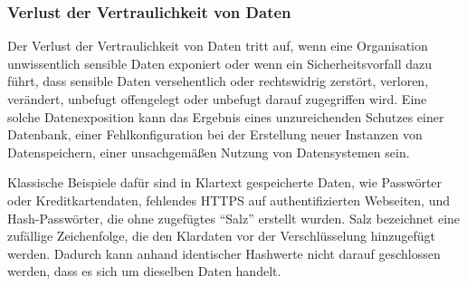 \subsubsection{Verlust der Vertraulichkeit von Daten}

Der Verlust der Vertraulichkeit von  Daten tritt auf, wenn eine
Organisation unwissentlich sensible Daten exponiert oder wenn ein
Sicherheitsvorfall dazu führt, dass sensible Daten versehentlich
oder rechtswidrig zerstört, verloren, verändert, unbefugt
offengelegt oder unbefugt darauf zugegriffen wird. Eine solche
Datenexposition kann das Ergebnis eines unzureichenden Schutzes einer
Datenbank, einer Fehlkonfiguration bei der Erstellung neuer Instanzen
von Datenspeichern, einer unsachgemäßen Nutzung von Datensystemen sein.

Klassische Beispiele dafür sind in Klartext gespeicherte Daten, wie
Passwörter oder Kreditkartendaten, fehlendes HTTPS auf
authentifizierten Webseiten, und Hash-Passwörter, die ohne zugefügtes
“Salz” erstellt wurden. Salz bezeichnet eine zufällige Zeichenfolge,
die den Klardaten vor der Verschlüsselung hinzugefügt werden. Dadurch
kann anhand identischer Hashwerte nicht darauf geschlossen werden,
dass es sich um dieselben Daten handelt.